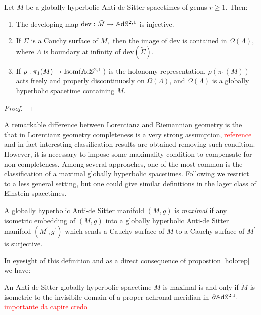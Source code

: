 \begin{proposition}\label{holorep}
    Let $M$ be a globally hyperbolic Anti-de Sitter spacetimes of genus $r\geq 1$. Then: 
    \begin{enumerate}
        \item The developing map $\text{dev}:\tilde{M}  \to  \mathbb{A}\mathrm{d}\mathbb{S}^{2,1}$ is injective. 
        \item If $\Sigma$ is a Cauchy surface of $M,$ then the image of dev is contained in $\Omega(\Lambda)$, where $\Lambda$ is boundary at infinity of $\text{dev}(\tilde{\Sigma}).$
        \item If $\rho:\pi_1(M)\to\text{Isom}(\mathbb{A}\mathrm{d}\mathbb{S}^{2,1,})$ is the holonomy representation, $\rho(\pi_1(M))$ acts freely and properly discontinuosly on $\Omega(\Lambda)$, and $\Omega(\Lambda)$ is a globally hyperbolic spacetime containing $M$. 
    \end{enumerate}
\end{proposition}

\begin{proof}
    
\end{proof}

A remarkable difference between Lorentianz and Riemannian geometry is the that in Lorentianz geometry completeness is a very strong assumption, \textcolor{red}{reference} and in fact interesting classification results are obtained removing such condition. However, it is necessary to impose some maximality condition to compensate for non-completeness. Among several  approaches, one of the most common is the classification of a maximal globally hyperbolic spacetimes. Following \cite{bonsanteseppi} we restrict to a less general setting, but one could give similar definitions in the lager class of Einstein spacetimes.

\begin{definition}
    A globally hyperbolic Anti-de Sitter manifold $(M,g)$ is \textit{maximal} if any isometric embedding of $(M,g)$ into a globally hyperbolic Anti-de Sitter manifold $(M^{\prime},g^{\prime})$ which sends a Cauchy surface of $M$ to a Cauchy surface of $M^{\prime}$ is surjective.
\end{definition}

In eyesight of this definition and as a direct consequence of propostion \ref{holorep} we have:

\begin{corollary}
An Anti-de Sitter globally hyperbolic spacetime $M$ is maximal is and only if $\tilde{M}$ is isometric to the invisibile domain of a proper achronal meridian in $\partial\mathbb{A}\mathrm{d}\mathbb{S}^{2,1}.$ \textcolor{red}{importante da capire credo}
\end{corollary}


